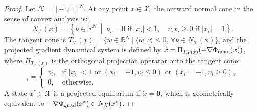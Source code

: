 \documentclass[11pt,a4paper]{article}
\begin{document}
\begin{proof}
Let $\mathcal{X} = [-1, 1]^N$. At any point $x \in \mathcal{X}$, the outward normal cone in the sense of convex analysis is:
\begin{equation}
N_{\mathcal{X}}(x) = \left\{ \nu \in \mathbb{R}^N \;\middle|\; \nu_i = 0 \text{ if } |x_i| < 1, \quad \nu_i x_i \ge 0 \text{ if } |x_i| = 1 \right\}.
\end{equation}
The tangent cone is $T_{\mathcal{X}}(x) = \{w \in \mathbb{R}^N \mid \langle w, \nu \rangle \le 0, \, \forall \nu \in N_{\mathcal{X}}(x)\}$, and the projected gradient dynamical system is defined by $\dot{x} = \Pi_{T_{\mathcal{X}}(x)}(-\nabla \Phi_{\rm quad}(x))$, where $\Pi_{T_{\mathcal{X}}(x)}$ is the orthogonal projection operator onto the tangent cone:
\begin{equation}
[\Pi_{T_{\mathcal{X}}(x)}(v)]_i = \begin{cases} 
v_i, & \text{if } |x_i| < 1 \text{ or } (x_i = +1, v_i \le 0) \text{ or } (x_i = -1, v_i \ge 0), \\ 
0, & \text{otherwise}. 
\end{cases}
\end{equation}
A state $x^* \in \mathcal{X}$ is a projected equilibrium if $\dot{x} = \mathbf{0}$, which is geometrically equivalent to $-\nabla \Phi_{\rm quad}(x^*) \in N_{\mathcal{X}}(x^*)$.


\end{proof}
\end{document}
